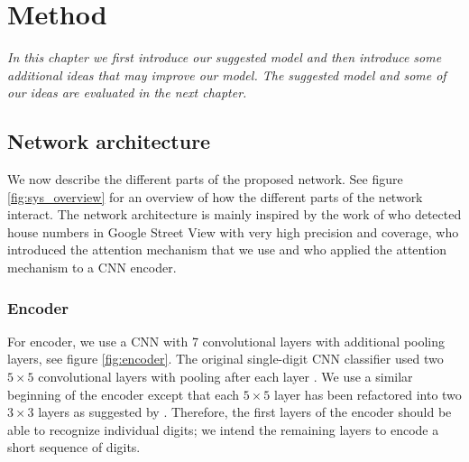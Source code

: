 \chapter{Method}

\textit{In this chapter we first introduce our suggested model and then introduce some additional ideas that may improve our model. The suggested model and some of our ideas are evaluated in the next chapter.}

\section{Network architecture} \label{sec:method_architecture}



We now describe the different parts of the proposed network. See figure \ref{fig:sys_overview} for an overview of how the different parts of the network interact.
The network architecture is mainly inspired by the work of \textcite{multidigit_streetview} who detected house numbers in Google Street View with very high precision and coverage, \textcite{machine_translation_attention} who introduced the attention mechanism that we use and \textcite{AttendAndTell} who applied the attention mechanism to a CNN encoder.

\subsection{Encoder}



For encoder, we use a CNN with 7 convolutional layers with additional pooling layers, see figure \ref{fig:encoder}.
The original single-digit CNN classifier used two $5 \times 5$ convolutional layers with pooling after each layer \cite{lecun_1989}.
We use a similar beginning of the encoder except that each $5 \times 5$ layer has been refactored into two $3 \times 3$ layers as suggested by \textcite{InceptionV3}. Therefore, the first layers of the encoder should be able to recognize individual digits; we intend the remaining layers to encode a short sequence of digits.


